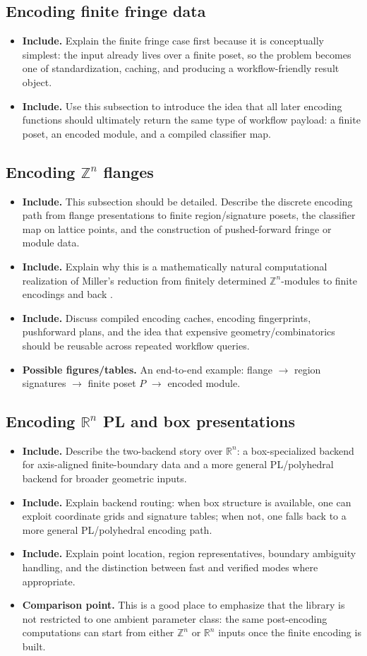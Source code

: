\documentclass[11pt]{article}
\newcommand{\R}{\mathbb{R}}
\newcommand{\Z}{\mathbb{Z}}
\newenvironment{plan}{\begin{itemize}[leftmargin=1.6em,itemsep=0.35em,topsep=0.25em]}{\end{itemize}}
\newcommand{\includeitems}[1]{\item \textbf{Include.} #1}
\newcommand{\figures}[1]{\item \textbf{Possible figures/tables.} #1}
\newcommand{\compare}[1]{\item \textbf{Comparison point.} #1}
\begin{document}
\subsection{Encoding finite fringe data}

\begin{plan}
    \includeitems{Explain the finite fringe case first because it is conceptually simplest: the input already lives over a finite poset, so the problem becomes one of standardization, caching, and producing a workflow-friendly result object.}
    \includeitems{Use this subsection to introduce the idea that all later encoding functions should ultimately return the same type of workflow payload: a finite poset, an encoded module, and a compiled classifier map.}
\end{plan}

\subsection{Encoding $\mathbb{Z}^n$ flanges}

\begin{plan}
    \includeitems{This subsection should be detailed. Describe the discrete encoding path from flange presentations to finite region/signature posets, the classifier map on lattice points, and the construction of pushed-forward fringe or module data.}
    \includeitems{Explain why this is a mathematically natural computational realization of Miller's reduction from finitely determined $\mathbb{Z}^n$-modules to finite encodings and back \cite{Mil20}.}
    \includeitems{Discuss compiled encoding caches, encoding fingerprints, pushforward plans, and the idea that expensive geometry/combinatorics should be reusable across repeated workflow queries.}
    \figures{An end-to-end example: flange $\to$ region signatures $\to$ finite poset $P$ $\to$ encoded module.}
\end{plan}

\subsection{Encoding $\mathbb{R}^n$ PL and box presentations}

\begin{plan}
    \includeitems{Describe the two-backend story over $\R^n$: a box-specialized backend for axis-aligned finite-boundary data and a more general PL/polyhedral backend for broader geometric inputs.}
    \includeitems{Explain backend routing: when box structure is available, one can exploit coordinate grids and signature tables; when not, one falls back to a more general PL/polyhedral encoding path.}
    \includeitems{Explain point location, region representatives, boundary ambiguity handling, and the distinction between fast and verified modes where appropriate.}
    \compare{This is a good place to emphasize that the library is not restricted to one ambient parameter class: the same post-encoding computations can start from either $\Z^n$ or $\R^n$ inputs once the finite encoding is built.}
\end{plan}
\end{document}
